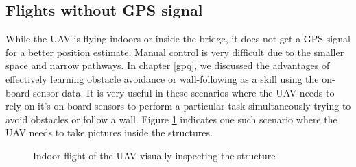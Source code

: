 \documentclass[12pt]{report}
\begin{document}
\subsection{Flights without GPS signal}
While the UAV is flying indoors or inside the bridge, it does not get a GPS signal for a better position estimate. Manual control is very difficult due to the smaller space and narrow pathways. In chapter \ref{gpq}, we discussed the advantages of effectively learning obstacle avoidance or wall-following as a skill using the on-board sensor data. It is very useful in these scenarios where the UAV needs to rely on it's on-board sensors to perform a particular task simultaneously trying to avoid obstacles or follow a wall. Figure \ref{fig:indoor_flight} indicates one such scenario where the UAV needs to take pictures inside the structures. \par 
\begin{figure}[htp]
	\centering 
	\caption{Indoor flight of the UAV visually inspecting the structure}
   \label{fig:indoor_flight}
\end{figure}
\end{document}
